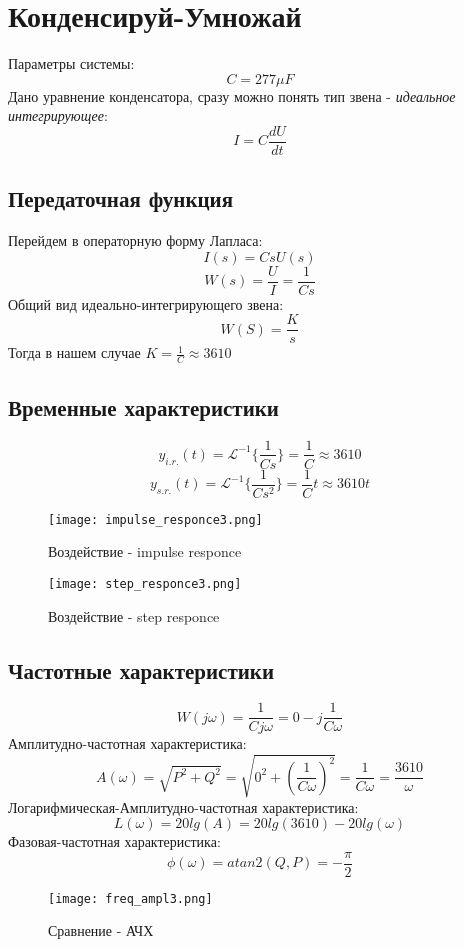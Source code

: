 \chapter{Конденсируй-Умножай}
\label{ch:chap3}
Параметры системы:
$$
 C = 277 \mu F
$$
Дано уравнение конденсатора, сразу можно понять тип звена - \textit{идеальное интегрирующее}:
$$
I = C\frac{dU}{dt}
$$


\section{Передаточная функция}
Перейдем в операторную форму Лапласа:
$$
I(s) = CsU(s)
$$
$$
W(s) = \frac{U}{I} = \frac{1}{Cs}
$$
Общий вид идеально-интегрирующего звена:
$$
W(S) = \frac{K}{s}
$$ Тогда в нашем случае $K = \frac{1}{C} \approx 3610$
\section{Временные  характеристики}
$$
y_{i.r.}(t) = \mathcal{L}^{-1}\{\frac{1}{Cs}\} = \frac{1}{C} \approx 3610
$$
$$
y_{s.r.}(t) = \mathcal{L}^{-1}\{\frac{1}{Cs^2}\} = \frac{1}{C}t \approx 3610t
$$

\newpage
\begin{figure}[ht]
  \centering
  \texttt{[image: impulse\_responce3.png]}
  \caption{Воздействие - \textrm{impulse responce}}
\end{figure}

\begin{figure}[ht]
    \centering
    \texttt{[image: step\_responce3.png]}
    \caption{Воздействие - \textrm{step responce}}
  \end{figure}
\newpage

\section{Частотные характеристики}
$$
W(j\omega) =  \frac{1}{Cj\omega} = 0 - j\frac{1}{C\omega}
$$
Амплитудно-частотная характеристика:
$$
A(\omega) = \sqrt{P^2 + Q^2} = \sqrt{0^2 + (\frac{1}{C\omega})^2} = \frac{1}{C\omega} = \frac{3610}{\omega}
$$
Логарифмическая-Амплитудно-частотная характеристика:
$$
L(\omega) = 20lg(A) = 20lg(3610) - 20lg(\omega)
$$
Фазовая-частотная характеристика:
$$
\phi(\omega) = atan2(Q,P) = -\frac{\pi}{2}
$$
\newpage
\begin{figure}[ht]
  \centering
  \texttt{[image: freq\_ampl3.png]}
\caption{Сравнение - АЧХ}
\end{figure}


